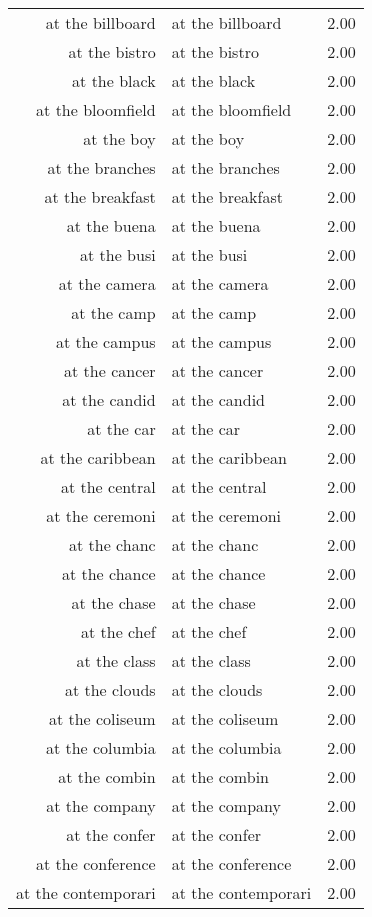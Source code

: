 \begin{table}[ht]
\begin{tabular}{rlr}
  at the billboard & at the billboard & 2.00 \\ 
  at the bistro & at the bistro & 2.00 \\ 
  at the black & at the black & 2.00 \\ 
  at the bloomfield & at the bloomfield & 2.00 \\ 
  at the boy & at the boy & 2.00 \\ 
  at the branches & at the branches & 2.00 \\ 
  at the breakfast & at the breakfast & 2.00 \\ 
  at the buena & at the buena & 2.00 \\ 
  at the busi & at the busi & 2.00 \\ 
  at the camera & at the camera & 2.00 \\ 
  at the camp & at the camp & 2.00 \\ 
  at the campus & at the campus & 2.00 \\ 
  at the cancer & at the cancer & 2.00 \\ 
  at the candid & at the candid & 2.00 \\ 
  at the car & at the car & 2.00 \\ 
  at the caribbean & at the caribbean & 2.00 \\ 
  at the central & at the central & 2.00 \\ 
  at the ceremoni & at the ceremoni & 2.00 \\ 
  at the chanc & at the chanc & 2.00 \\ 
  at the chance & at the chance & 2.00 \\ 
  at the chase & at the chase & 2.00 \\ 
  at the chef & at the chef & 2.00 \\ 
  at the class & at the class & 2.00 \\ 
  at the clouds & at the clouds & 2.00 \\ 
  at the coliseum & at the coliseum & 2.00 \\ 
  at the columbia & at the columbia & 2.00 \\ 
  at the combin & at the combin & 2.00 \\ 
  at the company & at the company & 2.00 \\ 
  at the confer & at the confer & 2.00 \\ 
  at the conference & at the conference & 2.00 \\ 
  at the contemporari & at the contemporari & 2.00 \\ 

\end{tabular}
\end{table}
